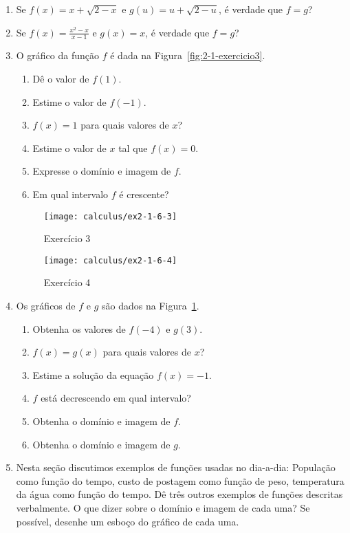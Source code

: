 \begin{enumerate}[label=\textbf{\arabic*.},leftmargin=*]
  \item Se $f(x)=x+\sqrt{2-x}$ e $g(u)=u+\sqrt{2-u}$, é verdade que $f=g$?
  \item Se $\displaystyle f(x)=\frac{x^2-x}{x-1}$ e $\displaystyle g(x)=x$, é verdade que $f=g$?\vspace{0.6mm}
  \item O gráfico da função $f$ é dada na Figura~\ref{fig:2-1-exercicio3}.
  \begin{enumerate}
    \item Dê o valor de $f(1)$.
    \item Estime o valor de $f(-1)$.
    \item $f(x)=1$ para quais valores de $x$?
    \item Estime o valor de $x$ tal que $f(x)=0$.
    \item Expresse o domínio e imagem de $f$.
    \item Em qual intervalo $f$ é crescente?
  \end{enumerate}\vspace{-0.3cm}
  \begin{figure}[!ht]
    \centering
    \begin{minipage}{0.426\columnwidth}
        \texttt{[image: calculus/ex2-1-6-3]}
        \caption{Exercício 3}
        \label{fig:2-1-exercicio3}
    \end{minipage}
    \begin{minipage}{0.40\columnwidth}
        \texttt{[image: calculus/ex2-1-6-4]}
        \caption{Exercício 4}
        \label{fig:2-1-exercicio4}
    \end{minipage}
  \end{figure}
  \item[\difficultQuestion] Os gráficos de $f$ e $g$ são dados na Figura~\ref{fig:2-1-exercicio4}.
  \begin{enumerate}
    \item Obtenha os valores de $f(-4)$ e $g(3)$.
    \item $f(x)=g(x)$ para quais valores de $x$?
    \item Estime a solução da equação $f(x)=-1$.
    \item $f$ está decrescendo em qual intervalo?
    \item Obtenha o domínio e imagem de $f$.
    \item Obtenha o domínio e imagem de $g$.
  \end{enumerate}
  \item Nesta seção discutimos exemplos de funções usadas no dia-a-dia: População como função do tempo, custo de postagem como função de peso, temperatura da água como função do tempo. Dê três outros exemplos de funções descritas verbalmente. O que dizer sobre o domínio e imagem de cada uma? Se possível, desenhe um esboço do gráfico de cada uma.
  

\end{enumerate}
